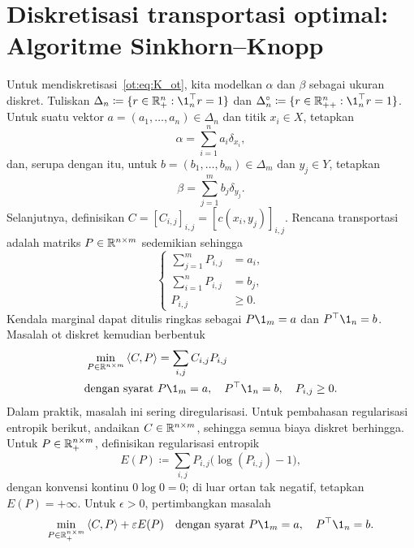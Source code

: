 \section{Diskretisasi transportasi optimal: Algoritme Sinkhorn--Knopp}
Untuk mendiskretisasi~\eqref{ot:eq:K_ot}, kita modelkan $\alpha$ dan $\beta$ sebagai ukuran diskret. Tuliskan
$\Delta_n\coloneqq\{r\in\R_+^n:\1_n^\top r=1\}$ dan
$\Delta_n^\circ\coloneqq\{r\in\R_{++}^n:\1_n^\top r=1\}$. Untuk suatu vektor $a=(a_1,\dots,a_n)\in\Delta_n$ dan titik $x_i\in X$, tetapkan
\begin{equation}
    \alpha=\sum_{i=1}^n a_i\delta_{x_i},
\end{equation}
dan, serupa dengan itu, untuk $b=(b_1,\dots,b_m)\in\Delta_m$ dan $y_j\in Y$, tetapkan
\begin{equation}
    \beta=\sum_{j=1}^m b_j\delta_{y_j}.
\end{equation}
Selanjutnya, definisikan $C=[C_{i,j}]_{i,j}=[c(x_i,y_j)]_{i,j}$. Rencana transportasi adalah matriks $P\in\mathbb{R}^{n\times m}$ sedemikian sehingga
\begin{equation}
    \begin{cases}
        \sum_{j=1}^mP_{i,j}&=a_i,\\
        \sum_{i=1}^nP_{i,j}&=b_j,\\
        P_{i,j}&\geq0.
    \end{cases}
\end{equation}
Kendala marginal dapat ditulis ringkas sebagai $P\1_m=a$ dan $P^\top\1_n=b$. Masalah \gls{ot} diskret kemudian berbentuk
\begin{equation}
    \begin{aligned}
        \min_{P\in\R^{n\times m}}\inner{C}{P}
        &=\sum_{i,j}C_{i,j}P_{i,j}\\
        \text{dengan syarat }&
        P\1_m=a,\quad P^\top\1_n=b,\quad P_{i,j}\geq0.
    \end{aligned}
\end{equation}
Dalam praktik, masalah ini sering diregularisasi. Untuk pembahasan regularisasi entropik berikut, andaikan $C\in\mathbb{R}^{n\times m}$, sehingga semua biaya diskret berhingga. Untuk $P\in\mathbb{R}_+^{n\times m}$, definisikan regularisasi entropik
\begin{equation}
    E(P)\coloneqq\sum_{i,j}P_{i,j}\big(\log(P_{i,j})-1\big),
\end{equation}
dengan konvensi kontinu $0\log0=0$; di luar ortan tak negatif, tetapkan $E(P)=+\infty$. Untuk $\epsilon>0$, pertimbangkan masalah
\begin{equation}\label{ot:eq:disc_entropic}
    \begin{aligned}
        \min_{P\in\R_+^{n\times m}}\inner{C}{P}+\epsilon E(P)
        \quad\text{dengan syarat }P\1_m=a,\quad P^\top\1_n=b.
    \end{aligned}
\end{equation}


